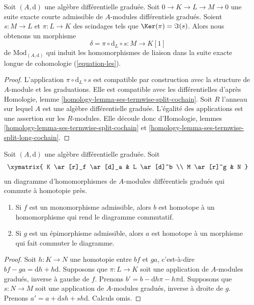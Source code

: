 \begin{lemma}
\label{lemma-admissible-ses}
Soit $(A, \text{d})$ une algèbre différentielle graduée.
Soit $0 \to K \to L \to M \to 0$ une suite exacte courte admissible de
$A$-modules différentiels gradués. Soient $s : M \to L$ et $\pi : L \to K$ des
scindages tels que $\Ker(\pi) = \Im(s)$. Alors
nous obtenons un morphisme
$$
\delta = \pi \circ \text{d}_L \circ s : M \to K[1]
$$
de $\text{Mod}_{(A, \text{d})}$ qui induit les homomorphismes de
liaison dans la suite exacte longue de cohomologie (\ref{equation-les}).
\end{lemma}

\begin{proof}
L'application $\pi \circ \text{d}_L \circ s$ est compatible par construction
avec la structure de $A$-module et les graduations. Elle est compatible
avec les différentielles d'après
Homologie, lemme
\ref{homology-lemma-ses-termwise-split-cochain}. Soit $R$ l'anneau sur lequel $A$ est une algèbre différentielle
graduée. L'égalité des applications est une assertion sur les $R$-modules.
Elle découle donc d'Homologie,
lemmes \ref{homology-lemma-ses-termwise-split-cochain} et
\ref{homology-lemma-ses-termwise-split-long-cochain}.
\end{proof}

\begin{lemma}
\label{lemma-make-commute-map}
Soit $(A, \text{d})$ une algèbre différentielle graduée. Soit
$$
\xymatrix{
K \ar[r]_f \ar[d]_a & L \ar[d]^b \\ M
\ar[r]^g & N
}
$$
un diagramme d'homomorphismes de $A$-modules différentiels gradués
qui commute à homotopie près.
\begin{enumerate}
\item Si $f$ est un monomorphisme admissible, alors $b$ est homotope à un
homomorphisme qui rend le diagramme commutatif.
\item Si $g$ est un épimorphisme admissible, alors $a$ est homotope à
un morphisme qui fait commuter le diagramme.
\end{enumerate}
\end{lemma}

\begin{proof}
Soit $h : K \to N$ une homotopie entre $bf$ et $ga$, c'est-à-dire $bf
- ga = \text{d}h + h\text{d}$. Supposons que $\pi : L \to K$ soit une
application de $A$-modules gradués, inverse à gauche de $f$.
Prenons $b' = b - \text{d}h\pi - h\pi \text{d}$.
Supposons que $s : N \to M$ soit une application de $A$-modules gradués, inverse à
droite de $g$. Prenons $a' = a + \text{d}sh +
sh\text{d}$. Calculs omis.
\end{proof}

